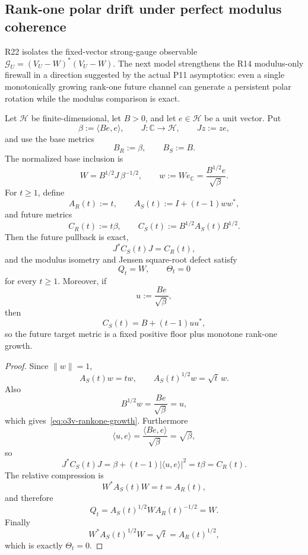 
\subsection{Rank-one polar drift under perfect modulus coherence}
\label{subsec:o3v-rankone-polar-drift}

R22 isolates the fixed-vector strong-gauge observable
\(
\mathscr G_U=(V_U-W)^*(V_U-W)
\).
The next model strengthens the R14 modulus-only firewall in a direction suggested by
the actual P11 asymptotics: even a single monotonically growing rank-one future channel
can generate a persistent polar rotation while the modulus comparison is exact.

\begin{proposition}
\label{prop:o3v-rankone-family}
Let \(\mathcal H\) be finite-dimensional, let \(B>0\), and let
\(e\in\mathcal H\) be a unit vector.  Put
\[
 \beta:=\langle Be,e\rangle,
 \qquad
 J:\mathbb C\to\mathcal H,
 \qquad Jz:=ze,
\]
and use the base metrics
\[
 B_R:=\beta,
 \qquad B_S:=B.
\]
The normalized base inclusion is
\[
 W=B^{1/2}J\,\beta^{-1/2},
 \qquad
 w:=We_\mathbb C=\frac{B^{1/2}e}{\sqrt\beta}.
\]
For \(t\ge1\), define
\[
 A_R(t):=t,
 \qquad
 A_S(t):=I+(t-1)ww^*,
\tag{O3V.1}\label{eq:o3v-relative}
\]
and future metrics
\[
 C_R(t):=t\beta,
 \qquad
 C_S(t):=B^{1/2}A_S(t)B^{1/2}.
\tag{O3V.2}\label{eq:o3v-future}
\]
Then the future pullback is exact,
\[
 \boxed{J^*C_S(t)J=C_R(t),}
\tag{O3V.3}\label{eq:o3v-pullback}
\]
and the modulus isometry and Jensen square-root defect satisfy
\[
 \boxed{Q_t=W,\qquad \Theta_t=0}
\tag{O3V.4}\label{eq:o3v-perfect-modulus}
\]
for every \(t\ge1\).
Moreover, if
\[
 u:=\frac{Be}{\sqrt\beta},
\]
then
\[
 \boxed{C_S(t)=B+(t-1)uu^*,}
\tag{O3V.5}\label{eq:o3v-rankone-growth}
\]
so the future target metric is a fixed positive floor plus monotone rank-one growth.
\end{proposition}

\begin{proof}
Since \(\|w\|=1\),
\[
 A_S(t)w=tw,
 \qquad
 A_S(t)^{1/2}w=\sqrt t\,w.
\]
Also
\[
 B^{1/2}w=\frac{Be}{\sqrt\beta}=u,
\]
which gives~\eqref{eq:o3v-rankone-growth}.  Furthermore
\[
 \langle u,e\rangle
 =\frac{\langle Be,e\rangle}{\sqrt\beta}
 =\sqrt\beta,
\]
so
\[
 J^*C_S(t)J
 =\beta+(t-1)|\langle u,e\rangle|^2
 =t\beta=C_R(t).
\]
The relative compression is
\[
 W^*A_S(t)W=t=A_R(t),
\]
and therefore
\[
 Q_t
 =A_S(t)^{1/2}WA_R(t)^{-1/2}
 =W.
\]
Finally
\[
 W^*A_S(t)^{1/2}W=\sqrt t=A_R(t)^{1/2},
\]
which is exactly \(\Theta_t=0\).
\end{proof}

